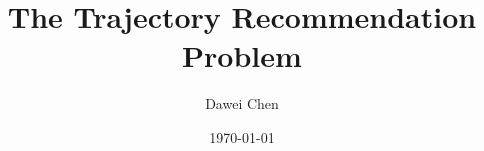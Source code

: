 \documentclass[9pt]{extarticle}
\title{The Trajectory Recommendation Problem}
\author{Dawei Chen}
\date{\today}
\begin{document}
\maketitle

\newcommand{\given}{\mid}
\newcommand{\llb}{\llbracket}
\newcommand{\rrb}{\rrbracket}








%
%
%




\end{document}
